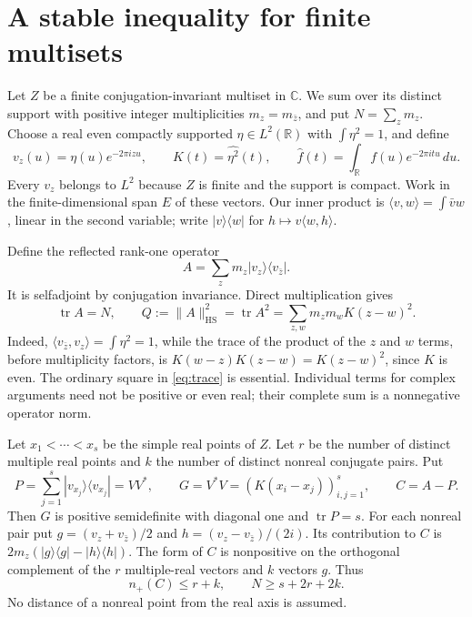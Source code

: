 \documentclass[11pt]{article}
\theoremstyle{remark}
\DeclareMathOperator{\tr}{tr}
\newcommand{\R}{\mathbb R}
\newcommand{\C}{\mathbb C}
\newcommand{\HS}{\mathrm{HS}}
\begin{document}
\section{A stable inequality for finite multisets}

Let $Z$ be a finite conjugation-invariant multiset in $\C$. We sum over its
distinct support with positive integer multiplicities $m_z=m_{\bar z}$,
and put $N=\sum_zm_z$. Choose a real even compactly supported
$\eta\in L^2(\R)$ with $\int\eta^2=1$, and define
\[
 v_z(u)=\eta(u)e^{-2\pi izu},\qquad
 K(t)=\widehat{\eta^2}(t),\qquad
 \widehat f(t)=\int_{\R}f(u)e^{-2\pi itu}\,du.
\]
Every $v_z$ belongs to $L^2$ because $Z$ is finite and the support is compact.
Work in the finite-dimensional span $E$ of these vectors. Our inner product
is $\langle v,w\rangle=\int\bar v w$, linear in the second variable; write
$|v\rangle\langle w|$ for $h\mapsto v\langle w,h\rangle$.

Define the reflected rank-one operator
\begin{equation}\label{eq:operator}
 A=\sum_zm_z|v_z\rangle\langle v_{\bar z}|.
\end{equation}
It is selfadjoint by conjugation invariance. Direct multiplication gives
\begin{equation}\label{eq:trace}
 \tr A=N,\qquad
 Q:=\|A\|_{\HS}^2=\tr A^2
   =\sum_{z,w}m_zm_wK(z-w)^2.
\end{equation}
Indeed, $\langle v_{\bar z},v_z\rangle=\int\eta^2=1$, while the trace
of the product of the $z$ and $w$ terms, before multiplicity factors, is
$K(w-z)K(z-w)=K(z-w)^2$, since $K$ is even. The ordinary square in
\eqref{eq:trace} is essential. Individual terms for complex arguments need
not be positive or even real; their complete sum is a nonnegative operator
norm.

Let $x_1<\cdots<x_s$ be the simple real points of $Z$. Let $r$ be the
number of distinct multiple real points and $k$ the number of distinct
nonreal conjugate pairs. Put
\[
 P=\sum_{j=1}^s|v_{x_j}\rangle\langle v_{x_j}|=VV^*,\qquad
 G=V^*V=(K(x_i-x_j))_{i,j=1}^s,\qquad C=A-P.
\]
Then $G$ is positive semidefinite with diagonal one and $\tr P=s$.
For each nonreal pair put
$g=(v_z+v_{\bar z})/2$ and $h=(v_z-v_{\bar z})/(2i)$. Its contribution
to $C$ is $2m_z(|g\rangle\langle g|-|h\rangle\langle h|)$.
The form of $C$ is nonpositive on the orthogonal complement of the $r$
multiple-real vectors and $k$ vectors $g$. Thus
\begin{equation}\label{eq:inertia}
 n_+(C)\le r+k,\qquad N\ge s+2r+2k.
\end{equation}
No distance of a nonreal point from the real axis is assumed.
\end{document}
